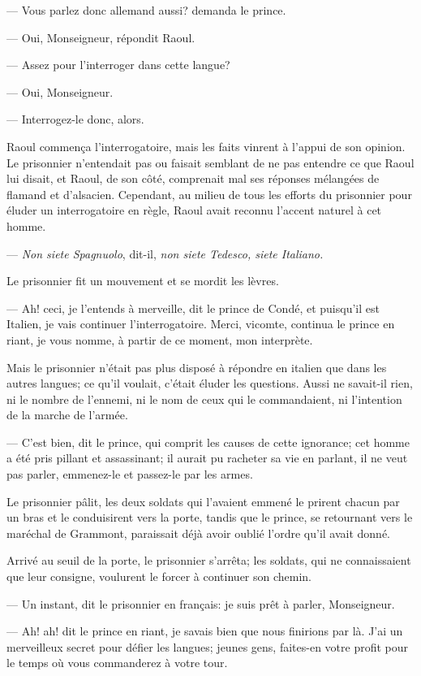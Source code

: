 — Vous parlez donc allemand aussi? demanda le prince.

— Oui, Monseigneur, répondit Raoul.

— Assez pour l'interroger dans cette langue?

— Oui, Monseigneur.

— Interrogez-le donc, alors.

Raoul commença l'interrogatoire, mais les faits vinrent à l'appui de son opinion. Le prisonnier n'entendait pas ou faisait semblant de ne pas entendre ce que Raoul lui disait, et Raoul, de son côté, comprenait mal ses réponses mélangées de flamand et d'alsacien. Cependant, au milieu de tous les efforts du prisonnier pour éluder un interrogatoire en règle, Raoul avait reconnu l'accent naturel à cet homme.

— \textit{Non siete Spagnuolo}, dit-il, \textit{non siete Tedesco, siete Italiano.}

Le prisonnier fit un mouvement et se mordit les lèvres.

— Ah! ceci, je l'entends à merveille, dit le prince de Condé, et puisqu'il est Italien, je vais continuer l'interrogatoire. Merci, vicomte, continua le prince en riant, je vous nomme, à partir de ce moment, mon interprète.

Mais le prisonnier n'était pas plus disposé à répondre en italien que dans les autres langues; ce qu'il voulait, c'était éluder les questions. Aussi ne savait-il rien, ni le nombre de l'ennemi, ni le nom de ceux qui le commandaient, ni l'intention de la marche de l'armée.

— C'est bien, dit le prince, qui comprit les causes de cette ignorance; cet homme a été pris pillant et assassinant; il aurait pu racheter sa vie en parlant, il ne veut pas parler, emmenez-le et passez-le par les armes.

Le prisonnier pâlit, les deux soldats qui l'avaient emmené le prirent chacun par un bras et le conduisirent vers la porte, tandis que le prince, se retournant vers le maréchal de Grammont, paraissait déjà avoir oublié l'ordre qu'il avait donné.

Arrivé au seuil de la porte, le prisonnier s'arrêta; les soldats, qui ne connaissaient que leur consigne, voulurent le forcer à continuer son chemin.

— Un instant, dit le prisonnier en français: je suis prêt à parler, Monseigneur.

— Ah! ah! dit le prince en riant, je savais bien que nous finirions par là. J'ai un merveilleux secret pour défier les langues; jeunes gens, faites-en votre profit pour le temps où vous commanderez à votre tour.

